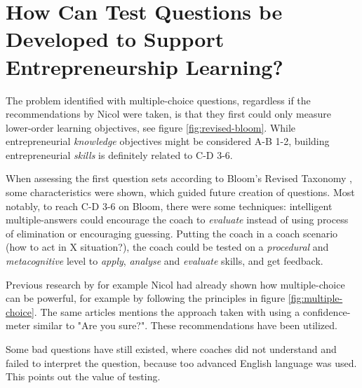 
\section{How Can Test Questions be Developed to Support Entrepreneurship Learning?} %

  The problem identified with multiple-choice questions, regardless if the recommendations by Nicol \cite{nicol} were taken, is that they first could only measure lower-order learning objectives, see figure \ref{fig:revised-bloom}. While entrepreneurial \textit{knowledge} objectives might be considered A-B 1-2, building entrepreneurial \textit{skills} is definitely related to C-D 3-6.

  When assessing the first question sets according to Bloom's Revised Taxonomy \citep{krathwohl}, some characteristics were shown, which guided future creation of questions. Most notably, to reach C-D 3-6 on Bloom, there were some techniques: intelligent multiple-answers could encourage the coach to \textit{evaluate} instead of using process of elimination or encouraging guessing. Putting the coach in a coach scenario (how to act in X situation?), the coach could be tested on a \textit{procedural} and \textit{metacognitive} level to \textit{apply}, \textit{analyse} and \textit{evaluate} skills, and get feedback.

  Previous research by for example Nicol \cite{nicol} had already shown how multiple-choice can be powerful, for example by following the principles in figure \ref{fig:multiple-choice}. The same articles mentions the approach taken with using a confidence-meter similar to "Are you sure?". These recommendations have been utilized.

  Some bad questions have still existed, where coaches did not understand and failed to interpret the question, because too advanced English language was used. This points out the value of testing.



